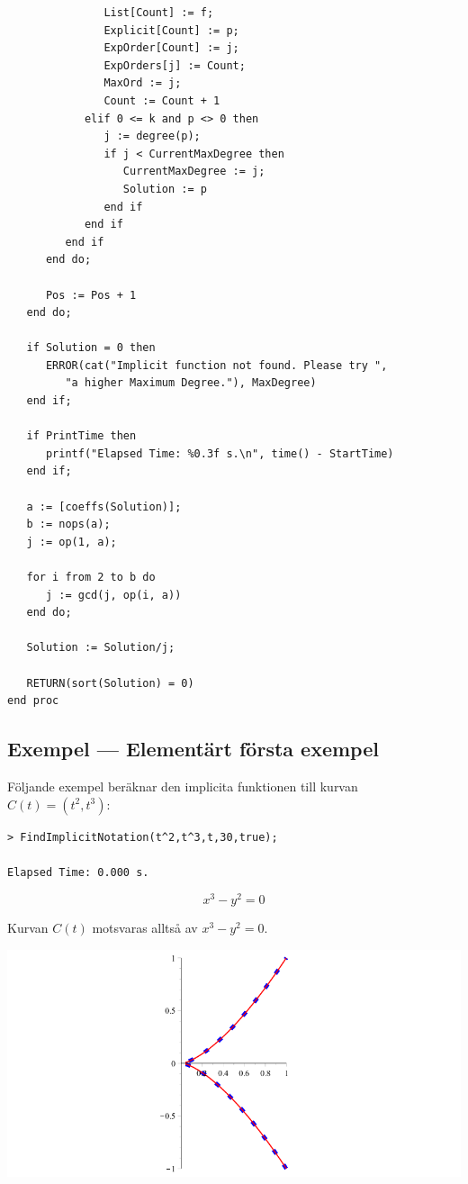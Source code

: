 \begin{verbatim}
               List[Count] := f;
               Explicit[Count] := p;
               ExpOrder[Count] := j;
               ExpOrders[j] := Count;
               MaxOrd := j;
               Count := Count + 1
            elif 0 <= k and p <> 0 then
               j := degree(p);
               if j < CurrentMaxDegree then 
                  CurrentMaxDegree := j; 
                  Solution := p 
               end if
            end if
         end if
      end do;

      Pos := Pos + 1
   end do;

   if Solution = 0 then
      ERROR(cat("Implicit function not found. Please try ",
         "a higher Maximum Degree."), MaxDegree)
   end if;

   if PrintTime then 
      printf("Elapsed Time: %0.3f s.\n", time() - StartTime) 
   end if;

   a := [coeffs(Solution)];
   b := nops(a);
   j := op(1, a);

   for i from 2 to b do 
      j := gcd(j, op(i, a)) 
   end do;

   Solution := Solution/j;

   RETURN(sort(Solution) = 0)
end proc\end{verbatim}

\subsection{Exempel --- Elementärt första exempel}
\label{ImplicitNotationEx1}

Följande exempel beräknar den implicita funktionen till kurvan $C(t) =
\left(t^2, t^3\right)$:

\begin{verbatim}
> FindImplicitNotation(t^2,t^3,t,30,true);

Elapsed Time: 0.000 s.
\end{verbatim}
\[x^3 - y^2 = 0\]

Kurvan $C(t)$ motsvaras alltså av $x^3 - y^2 = 0$.

\begin{center}
\includegraphics[scale=0.35]{Export/implicitplot1.png}
\end{center}

